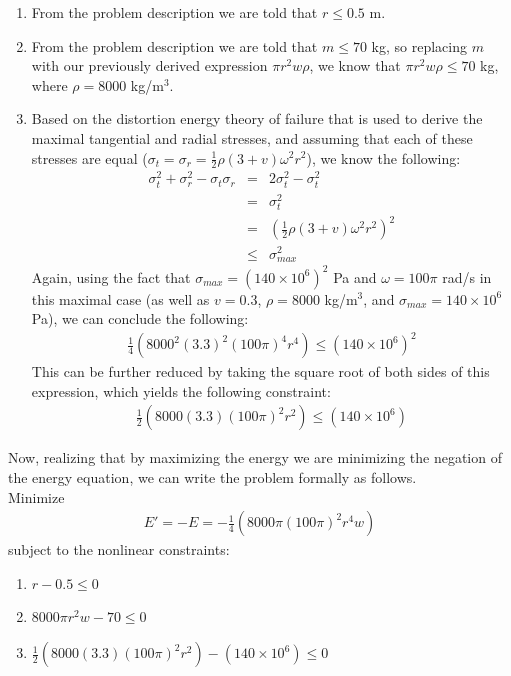 \documentclass[11pt]{article}
\begin{document}
\begin{solution}
\begin{enumerate}
	\item From the problem description we are told that $r \leq 0.5$ m.
	\item From the problem description we are told that $m \leq 70$ kg, so replacing $m$ with our previously derived expression $\pi r^2 w \rho$, we know that $\pi r^2 w \rho \leq 70$ kg, where $\rho = 8000$ kg/m$^3$.
	\item Based on the distortion energy theory of failure that is used to derive the maximal tangential and radial stresses, and assuming that each of these stresses are equal ($\sigma_t = \sigma_r = \frac{1}{2}\rho(3 + v)\omega^2r^2$), we know the following:
\begin{eqnarray*}
\sigma_t^2 + \sigma_r^2 - \sigma_t\sigma_r & = & 2\sigma_t^2 - \sigma_t^2 \\
& = & \sigma_t^2 \\
& = & (\frac{1}{2}\rho(3 + v)\omega^2r^2)^2 \\
& \leq & \sigma_{max}^2
\end{eqnarray*}
Again, using the fact that $\sigma_{max} = (140 \times 10^6)^2$ Pa and $\omega = 100\pi$ rad/s in this maximal case (as well as $v = 0.3$, $\rho = 8000$ kg/m$^3$, and $\sigma_{max} = 140 \times 10^6$ Pa), we can conclude the following:
\begin{eqnarray*}
\frac{1}{4}(8000^2(3.3)^2(100\pi)^4r^4) \leq (140 \times 10^6)^2
\end{eqnarray*}
This can be further reduced by taking the square root of both sides of this expression, which yields the following constraint:
\begin{eqnarray*}
\frac{1}{2}(8000(3.3)(100\pi)^2r^2) \leq (140 \times 10^6)
\end{eqnarray*}
\end{enumerate}
Now, realizing that by maximizing the energy we are minimizing the negation of the energy equation, we can write the problem formally as follows. \\

Minimize
\begin{eqnarray*}
E' = -E = -\frac{1}{4}(8000\pi(100\pi)^2r^4 w) 
\end{eqnarray*}
subject to the nonlinear constraints:
\begin{enumerate}
	\item $r - 0.5 \leq 0$
	\item $8000\pi r^2 w  - 70 \leq 0$
	\item $\frac{1}{2}(8000(3.3)(100\pi)^2r^2) - (140 \times 10^6) \leq 0$
\end{enumerate}
\end{solution}
\end{document}
